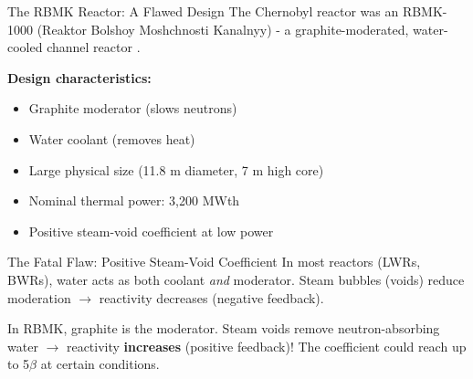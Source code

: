 \documentclass[aspectratio=169]{beamer}
\begin{document}
\begin{frame}[allowframebreaks]{The RBMK Reactor: A Flawed Design}
    The Chernobyl reactor was an RBMK-1000 (Reaktor Bolshoy Moshchnosti Kanalnyy) - a graphite-moderated, water-cooled channel reactor \cite{malko2002chernobyl}.

    \vspace{1em}
    \textbf{Design characteristics:}
    \begin{itemize}
        \item Graphite moderator (slows neutrons)
        \item Water coolant (removes heat)
        \item Large physical size (11.8 m diameter, 7 m high core)
        \item Nominal thermal power: 3,200 MWth
        \item Positive steam-void coefficient at low power
    \end{itemize}

    \vspace{1em}
    \begin{alertblock}{The Fatal Flaw: Positive Steam-Void Coefficient}
        In most reactors (LWRs, BWRs), water acts as both coolant \textit{and} moderator. Steam bubbles (voids) reduce moderation $\rightarrow$ reactivity decreases (negative feedback).
        
        In RBMK, graphite is the moderator. Steam voids remove neutron-absorbing water $\rightarrow$ reactivity \textbf{increases} (positive feedback)! The coefficient could reach up to 5$\beta$ at certain conditions.
    \end{alertblock}
\end{frame}
\end{document}
